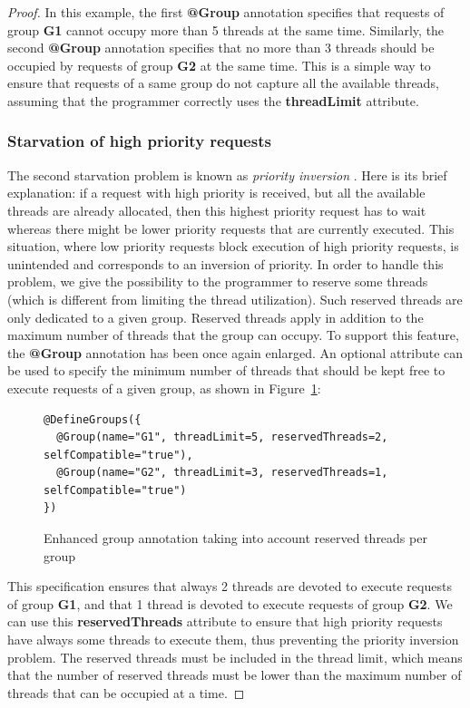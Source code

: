 \documentclass[11pt]{report}
\begin{document}
\begin{proof}
In this example, the first \textbf{@Group} annotation specifies that requests of group \textbf{G1} cannot occupy more than 5 threads at the same time. Similarly, the second \textbf{@Group} annotation specifies that no more than 3 threads should be occupied by requests of group \textbf{G2} at the same time.
This is a simple way to ensure that requests of a same group do not capture all the available threads, assuming that the programmer correctly uses the \textbf{threadLimit} attribute.

\subsubsection{Starvation of high priority requests}
The second starvation problem is known as \emph{priority inversion} \cite{Lampson:1980:EPM:358818.358824}. Here is its brief explanation: if a request with high priority is received, but all the available threads are already allocated, then this highest priority request has to wait whereas there might be lower priority requests that are currently executed. This situation, where low priority requests block execution of high priority requests, is unintended and corresponds to an inversion of priority. In order to handle this problem, we give the possibility to the programmer to reserve some threads (which is different from limiting the thread utilization). Such reserved threads are only dedicated to a given group. Reserved threads apply in addition to the maximum number of threads that the group can occupy. To support this feature, the \textbf{@Group} annotation has been once again enlarged. An optional attribute can be used to specify the minimum number of threads that should be kept free to execute requests of a given group, as shown in Figure~\ref{fig:new_new_groups}:

\begin{figure}[!ht]
	\lstset{language=java, numbers=left, numberstyle=\tiny, stepnumber=1, numbersep=5pt, basicstyle=\footnotesize}
	\begin{lstlisting}[frame=single]
@DefineGroups({
  @Group(name="G1", threadLimit=5, reservedThreads=2, selfCompatible="true"),
  @Group(name="G2", threadLimit=3, reservedThreads=1, selfCompatible="true")
})
 	\end{lstlisting}
\caption{Enhanced group annotation taking into account reserved threads per group}
\label{fig:new_new_groups}
\end{figure}

This specification ensures that always 2 threads are devoted to execute requests of group \textbf{G1}, and that 1 thread is devoted to execute requests of group \textbf{G2}. We can use this \textbf{reservedThreads} attribute to ensure that high priority requests have always some threads to execute them, thus preventing the priority inversion problem.
The reserved threads must be included in the thread limit, which means that the number of reserved threads must be lower than the maximum number of threads that can be occupied at a time.


\end{proof}
\end{document}
